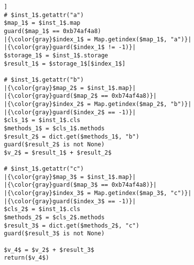 \begin{lstlisting}[mathescape,escapechar=|,basicstyle=\ttfamily]]
# $inst_1$.getattr("a")
$map_1$ = $inst_1$.map
guard($map_1$ == 0xb74af4a8)
|{\color{gray}$index_1$ = Map.getindex($map_1$, "a")}|
|{\color{gray}guard($index_1$ != -1)}|
$storage_1$ = $inst_1$.storage
$result_1$ = $storage_1$[$index_1$]

# $inst_1$.getattr("b")
|{\color{gray}$map_2$ = $inst_1$.map}|
|{\color{gray}guard($map_2$ == 0xb74af4a8)}|
|{\color{gray}$index_2$ = Map.getindex($map_2$, "b")}|
|{\color{gray}guard($index_2$ == -1)}|
$cls_1$ = $inst_1$.cls
$methods_1$ = $cls_1$.methods
$result_2$ = dict.get($methods_1$, "b")
guard($result_2$ is not None)
$v_2$ = $result_1$ + $result_2$

# $inst_1$.getattr("c")
|{\color{gray}$map_3$ = $inst_1$.map}|
|{\color{gray}guard($map_3$ == 0xb74af4a8)}|
|{\color{gray}$index_3$ = Map.getindex($map_3$, "c")}|
|{\color{gray}guard($index_3$ == -1)}|
$cls_2$ = $inst_1$.cls
$methods_2$ = $cls_2$.methods
$result_3$ = dict.get($methods_2$, "c")
guard($result_3$ is not None)

$v_4$ = $v_2$ + $result_3$
return($v_4$)
\end{lstlisting}
